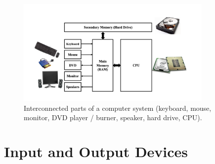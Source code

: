 \begin{figure}
	\centering
	\includegraphics[width=0.85\textwidth]{images/cs_intro_hardware_overview.png}
	\caption{Interconnected parts of a computer system (keyboard, mouse,
                 monitor, DVD player / burner, speaker, hard drive, CPU).
                 }
	\label{fig:hardware:overview}
\end{figure}

\section{Input and Output Devices}

